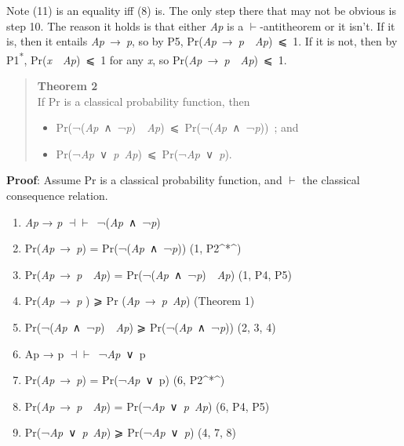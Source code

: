\documentclass[
  10pt,
  letterpaper,
  DIV=11,
  numbers=noendperiod,
  twoside]{scrartcl}
\providecommand{\tightlist}{%
  \setlength{\itemsep}{0pt}\setlength{\parskip}{0pt}}\usepackage{longtable,booktabs,array}
\begin{document}
Note (11) is an equality iff (8) is. The only step there that may not be
obvious is step 10. The reason it holds is that either \emph{Ap} is a
\(\vdash\)-antitheorem or it isn't. If it is, then it entails
\emph{Ap}~→~\emph{p}, so by P5,
Pr(\emph{Ap}~→~\emph{p}~\textbar~\emph{Ap})~⩽~1. If it is not, then by
P1\textsuperscript{*}, Pr(\emph{x}~\textbar~\emph{Ap})~⩽~1 for any
\emph{x}, so Pr(\emph{Ap}~→~\emph{p}~\textbar~\emph{Ap})~⩽~1.

\begin{quote}
\textbf{Theorem 2}\\
If Pr is a classical probability function, then

\begin{itemize}
\tightlist
\item
  Pr(¬(\emph{Ap}~∧~¬\emph{p})~\textbar~\emph{Ap})~⩽~Pr(¬(\emph{Ap}~∧~¬\emph{p}))~;
  and
\item
  Pr(¬\emph{Ap}~∨~\emph{p}\textbar~\emph{Ap})~⩽~Pr(¬\emph{Ap}~∨~\emph{p}).
\end{itemize}
\end{quote}

\textbf{Proof}: Assume Pr is a classical probability function, and
\(\vdash\) the classical consequence relation.

\begin{enumerate}
\def\labelenumi{\arabic{enumi}.}
\tightlist
\item
  \emph{Ap} → \emph{p} \(\dashv \vdash\)~¬(\emph{Ap}~∧~¬\emph{p})
\item
  Pr(\emph{Ap}~→~\emph{p}) = Pr(¬(\emph{Ap}~∧~¬\emph{p})) (1,
  P2\^{}*\^{})
\item
  Pr(\emph{Ap}~→~\emph{p}~\textbar~\emph{Ap}) =
  Pr(¬(\emph{Ap}~∧~¬\emph{p})~\textbar~\emph{Ap}) (1, P4, P5)
\item
  Pr(\emph{Ap}~→~\emph{p} ) ⩾ Pr
  (\emph{Ap}~→~\emph{p}\textbar~\emph{Ap}) (Theorem 1)
\item
  Pr(¬(\emph{Ap}~∧~¬\emph{p})~\textbar~\emph{Ap}) ⩾
  Pr(¬(\emph{Ap}~∧~¬\emph{p})) (2, 3, 4)
\item
  Ap → p \(\dashv \vdash\)~¬\emph{Ap}~∨~p
\item
  Pr(\emph{Ap}~→~\emph{p}) = Pr(¬\emph{Ap}~∨~p) (6, P2\^{}*\^{})
\item
  Pr(\emph{Ap}~→~\emph{p}~\textbar~\emph{Ap}) =
  Pr(¬\emph{Ap}~∨~\emph{p}\textbar~\emph{Ap}) (6, P4, P5)
\item
  Pr(¬\emph{Ap}~∨~\emph{p}\textbar~\emph{Ap}) ⩾
  Pr(¬\emph{Ap}~∨~\emph{p}) (4, 7, 8)
\end{enumerate}
\end{document}
